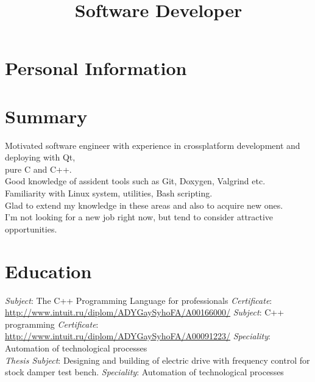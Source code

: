 \documentclass[11pt,a4paper]{moderncv}
\title{Software Developer}
\begin{document}
\maketitle

\section{Personal Information}

\section{Summary}
Motivated software engineer with experience in crossplatform development and deploying with Qt, \\pure C and C++.\\
Good knowledge of assident tools such as Git, Doxygen, Valgrind etc.\\
Familiarity with Linux system, utilities, Bash scripting.\\
Glad to extend my knowledge in these areas and also to acquire new ones.\\
I'm not looking for a new job right now, but tend to consider attractive opportunities.

\section{Education}
{\textit{Subject}: The C++ Programming Language for professionals
\newline \textit{Certificate}: {\color{web} \url{http://www.intuit.ru/diplom/ADYGaySyhoFA/A00166000/}}}
{\textit{Subject}: C++ programming
\newline \textit{Certificate}: {\color{web} \url{http://www.intuit.ru/diplom/ADYGaySyhoFA/A00091223/}}}
{\textit{Speciality}: Automation of technological processes\\
 \textit{Thesis Subject}: Designing and building of electric drive with frequency control for stock damper test bench.}
{\textit{Speciality}: Automation of technological processes}
\end{document}
